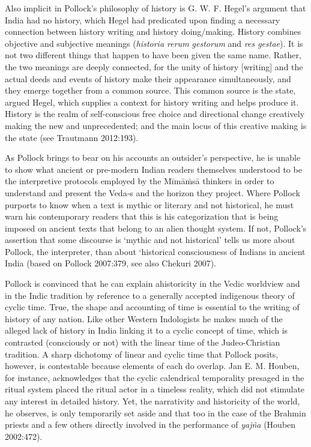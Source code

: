 Also implicit in Pollock’s philosophy of history is G. W. F. Hegel’s argument that India had no history, which Hegel had predicated upon finding a necessary connection between history writing and history doing/making. History combines objective and subjective meanings (\textit{historia rerum gestorum} and \textit{res gestae}). It is not two different things that happen to have been given the same name. Rather, the two meanings are deeply connected, for the unity of history [writing] and the actual deeds and events of history make their appearance simultaneously, and they emerge together from a common source. This common source is the state, argued Hegel, which supplies a context for history writing and helps produce it. History is the realm of self-conscious free choice and directional change creatively making the new and unprecedented; and the main locus of this creative making is the state (see Trautmann 2012:193).

As Pollock brings to bear on his accounts an outsider’s perspective, he is unable to show what ancient or pre-modern Indian readers themselves understood to be the interpretive protocols employed by the Mīmāṁsā thinkers in order to understand and present the Veda-s and the horizon they project. Where Pollock purports to know when a text is mythic or literary and not historical, he must warn his contemporary readers that this is his categorization that is being imposed on ancient texts that belong to an alien thought system. If not, Pollock’s assertion that some discourse is ‘mythic and not historical’ tells us more about Pollock, the interpreter, than about ‘historical consciousness of Indians in ancient India (based on Pollock 2007:379, see also Chekuri 2007).

Pollock is convinced that he can explain ahistoricity in the Vedic worldview and in the Indic tradition by reference to a generally accepted indigenous theory of cyclic time. True, the shape and accounting of time is essential to the writing of history of any nation. Like other Western Indologists he makes much of the alleged lack of history in India linking it to a cyclic concept of time, which is contrasted (consciously or not) with the linear time of the Judeo-Christian tradition. A sharp dichotomy of linear and cyclic time that Pollock posits, however, is contestable because elements of each do overlap. Jan E. M. Houben, for instance, acknowledges that the cyclic calendrical temporality presaged in the ritual system placed the ritual actor in a timeless reality, which did not stimulate any interest in detailed history. Yet, the narrativity and historicity of the world, he observes, is only temporarily set aside and that too in the case of the Brahmin priests and a few others directly involved in the performance of \textit{yajña} (Houben 2002:472).

